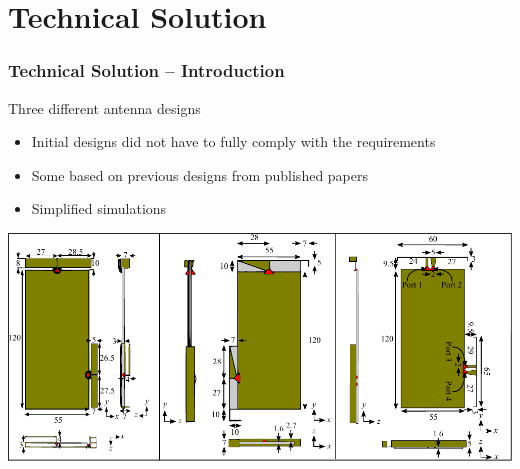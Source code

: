 \section{Technical Solution}
\begin{frame}
    \frametitle{Technical Solution -- Introduction}
    \begin{block}{Three different antenna designs}
      \begin{itemize}
      \item Initial designs did not have to fully comply with the requirements
      \item Some based on previous designs from published papers
      \item Simplified simulations
      \end{itemize}
    \end{block}
\vspace*{-0.5cm}
  \begin{center} 
    \includegraphics[width=\textwidth]{img/henrik/all_td}%

  \end{center}
\end{frame}


